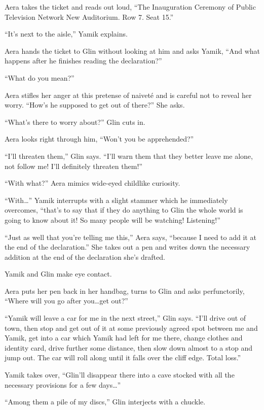 \documentclass[twoside,11pt]{book}
\begin{document}
Aera takes the ticket and reads out loud, ``The Inauguration Ceremony of Public Television Network New
Auditorium. Row 7. Seat 15.''

``It's next to the aisle,'' Yamik explains.

Aera hands the ticket to Glin without looking at him and asks Yamik, ``And what happens after he finishes
reading the declaration?''

``What do you mean?''

Aera stifles her anger at this pretense of naivet\'e and is careful not to reveal her worry. ``How's he
supposed to get out of there?'' She asks.

``What's there to worry about?'' Glin cuts in{.}

Aera looks right through him, ``Won't you be apprehended?''

``I'll threaten them,'' Glin says. ``I'll warn them that they better leave me
alone, not follow me! I'll definitely threaten them!''

``With what?'' Aera mimics wide-eyed childlike curiosity.

``With{\ldots}'' Yamik interrupts with a slight stammer which he immediately overcomes,
``that's to say that if they do anything to Glin the whole world
is going to know about it! So many people
will be watching! Listening!''

``Just as well that you're telling me this,'' Aera says, ``because I need to add
it at the end of the declaration.'' She takes out a pen and writes down the necessary addition at the end
of the declaration she's drafted.

Yamik and Glin make eye contact.

Aera puts her pen back in her handbag, turns to Glin and asks perfunctorily, ``Where will you go after
you{\ldots}get out?''

``Yamik will leave a car for me in the next street,'' Glin says. ``I'll drive out
of town, then stop and get out of it at some previously agreed spot between me and Yamik, get into a car which Yamik
had left for me there, change clothes and identity card, drive further some distance, then slow down almost to a stop
and jump out. The car will roll along until it falls over the cliff edge. Total loss.''

Yamik takes over, ``Glin'll disappear there into a cave stocked with all the necessary provisions for a few
days{\ldots}''

``Among them a pile of my discs,'' Glin interjects with a chuckle.
\end{document}
